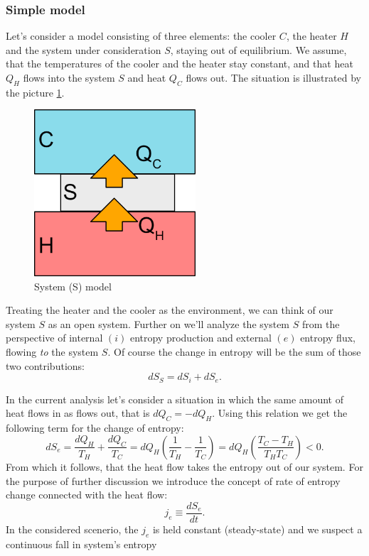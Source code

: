 \documentclass[a4paper,12pt,nofootinbib]{article}
\begin{document}

\subsubsection{Simple model}
Let's consider a model consisting of three elements: the cooler $C$, the heater $H$ and the system under consideration $S$, staying out of equilibrium.
We assume, that the temperatures of the cooler and the heater stay constant, and that heat $Q_H$ flows into the system $S$ and heat $Q_C$ flows out. The situation is illustrated by the picture \ref{Fig2}.
\begin{figure}[ht!]
\centering \includegraphics[width=6cm]{system} \caption{System (S) model}
\label{Fig2} 
\end{figure}

Treating the heater and the cooler as the environment, we can think of our system $S$ as an open system.
Further on we'll analyze the system $S$ from the perspective of internal $(i)$ entropy production
and external $(e)$ entropy flux, flowing \emph{to} the system $S$. 
Of course the change in entropy will be the sum of those two contributions:
\begin{equation}
dS_S=dS_i+dS_e.
\label{entrosum}
\end{equation}

In the current analysis let's consider a situation in which the same amount of heat flows in as flows out, that is $dQ_C=-dQ_H$. Using this relation we get the following term for the change of entropy:
\begin{equation}
dS_e=\frac{dQ_H}{T_H}+\frac{dQ_C}{T_C}=dQ_H\left(\frac{1}{T_H}-\frac{1}{T_C}\right)
=dQ_H\left(\frac{T_C-T_H}{T_HT_C}\right)<0.
\label{dSe1}
\end{equation}
From which it follows, that the heat flow takes the entropy out of our system.
For the purpose of further discussion we introduce the concept of rate of entropy change connected with the heat flow:
\begin{equation}
j_e \equiv  \frac{dS_e}{dt}. 
\end{equation}
In the considered scenerio, the $j_e$ is held constant (steady-state) and we suspect a continuous fall in system's entropy
\end{document}
